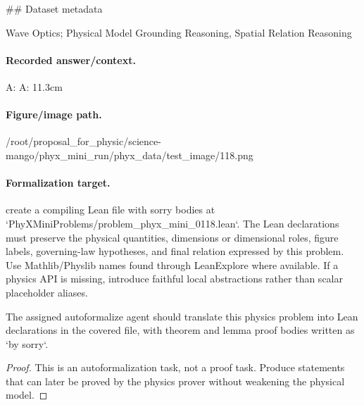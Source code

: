 \#\# Dataset metadata

Wave Optics; Physical Model Grounding Reasoning, Spatial Relation Reasoning

\paragraph{Recorded answer/context.}
A: A: 11.3cm

\paragraph{Figure/image path.}
/root/proposal\_for\_physic/science-mango/phyx\_mini\_run/phyx\_data/test\_image/118.png

\paragraph{Formalization target.}
create a compiling Lean file with sorry bodies at `PhyXMiniProblems/problem\_phyx\_mini\_0118.lean`. The Lean declarations must preserve the physical quantities, dimensions or dimensional roles, figure labels, governing-law hypotheses, and final relation expressed by this problem.
Use Mathlib/Physlib names found through LeanExplore where available. If a physics API is missing, introduce faithful local abstractions rather than scalar placeholder aliases.

\begin{theorem}
\label{thm:physics:phyx_mini_0118:target}
The assigned autoformalize agent should translate this physics problem into Lean declarations in the covered file, with theorem and lemma proof bodies written as `by sorry`.
\end{theorem}
\begin{proof}
This is an autoformalization task, not a proof task. Produce statements that can later be proved by the physics prover without weakening the physical model.
\end{proof}

